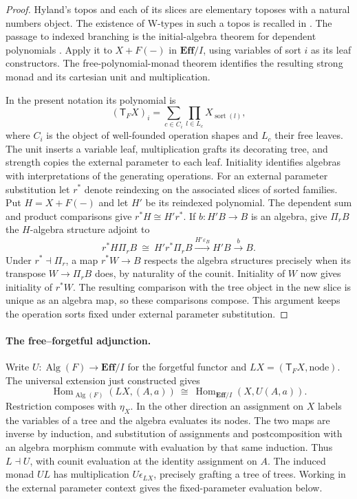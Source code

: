 \documentclass[11pt,a4paper]{article}
\theoremstyle{definition}
\theoremstyle{remark}\newaliascnt{remark}{theorem}
\newcommand{\E}{\mathbf{Eff}}
\newcommand{\Hom}{\operatorname{Hom}}
\numberwithin{equation}{section}
\begin{document}
\begin{proof}
Hyland's topos and each of its slices are elementary toposes with a natural numbers object. The existence of W-types in such a topos is recalled in \cite[\S4.3]{poly:gambino-kock}. The passage to indexed branching is the initial-algebra theorem for dependent polynomials \cite[Theorem 12]{gambino-hyland}. Apply it to \(X+F(-)\) in \(\E/I\), using variables of sort \(i\) as its leaf constructors. The free-polynomial-monad theorem \cite[Theorem 4.5]{poly:gambino-kock} identifies the resulting strong monad and its cartesian unit and multiplication.

In the present notation its polynomial is
\[
 (\mathsf T_FX)_i
   =\sum_{c\in C_i}\prod_{l\in L_c}X_{\operatorname{sort}(l)},
\]
where $C_i$ is the object of well-founded operation shapes and $L_c$
their free leaves. The unit inserts a variable leaf, multiplication
grafts its decorating tree, and strength copies the external
parameter to each leaf. Initiality identifies algebras with
interpretations of the generating operations. For an external parameter substitution let $r^*$ denote reindexing on the associated slices of sorted families. Put $H=X+F(-)$ and let $H'$ be its reindexed polynomial. The dependent sum and product comparisons give $r^*H\cong H'r^*$. If $b:H'B\to B$ is an algebra, give $\Pi_r B$ the $H$-algebra structure adjoint to
\[
 r^*H\Pi_r B\ \cong\ H'r^*\Pi_r B
      \xrightarrow{H'\varepsilon_B} H'B\xrightarrow{b}B .
\]
Under $r^*\dashv\Pi_r$, a map $r^*W\to B$ respects the algebra structures precisely when its transpose $W\to\Pi_r B$ does, by naturality of the counit. Initiality of $W$ now gives initiality of $r^*W$. The resulting comparison with the tree object in the new slice is unique as an algebra map, so these comparisons compose. This argument keeps the operation sorts fixed under external parameter substitution.
\end{proof}

\paragraph{The free--forgetful adjunction.}
Write \(U:\operatorname{Alg}(F)\to\E/I\) for the forgetful functor and \(L X=(\mathsf T_FX,\mathrm{node})\). The universal extension just constructed gives
\[
 \Hom_{\operatorname{Alg}(F)}(LX,(A,a))
 \ \cong\ \Hom_{\E/I}(X,U(A,a)).
\]
Restriction composes with \(\eta_X\). In the other direction an assignment on \(X\) labels the variables of a tree and the algebra evaluates its nodes. The two maps are inverse by induction, and substitution of assignments and postcomposition with an algebra morphism commute with evaluation by that same induction. Thus \(L\dashv U\), with counit evaluation at the identity assignment on \(A\). The induced monad \(UL\) has multiplication \(U\epsilon_{LX}\), precisely grafting a tree of trees. Working in the external parameter context gives the fixed-parameter evaluation below.
\end{document}

